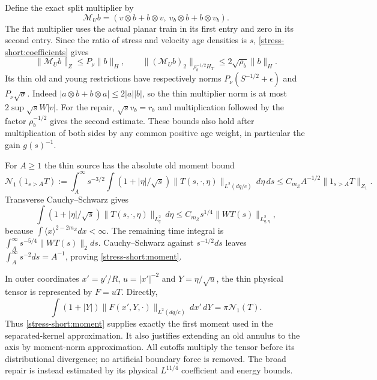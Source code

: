 Define the exact split multiplier by
\[
 \mathcal M_Ub=(v\otimes b+b\otimes v,\
                         v_b\otimes b+b\otimes v_b).
\]
The flat multiplier uses the actual planar train in its first entry
and zero in its second entry. Since the ratio of stress and velocity
age densities is $s$, \eqref{stress-short:coefficients} gives
\begin{equation}\label{stress-short:multiplier}
 \|\mathcal M_Ub\|_Z\le P_\nu\|b\|_H,\qquad
 \|(\mathcal M_Ub)_2\|_{\rho_b^{-1/2}H_T}
                         \le2\sqrt{\rho_b}\|b\|_H.
\end{equation}
Its thin old and young restrictions have respectively norms
$P_\nu(S^{-1/2}+\epsilon)$ and $P_\nu\sqrt{\sigma}$.
Indeed $|a\otimes b+b\otimes a|\le2|a||b|$, so the thin
multiplier norm is at most $2\sup\sqrt{s}W|v|$.
For the repair, $\sqrt{s}v_b=r_b$ and multiplication followed by
the factor $\rho_b^{-1/2}$ gives the second estimate.
These bounds also hold after multiplication of both sides by any
common positive age weight, in particular the gain $g(s)^{-1}$.

For $A\ge1$ the thin source has the absolute old moment bound
\begin{equation}\label{stress-short:moment}
 \mathcal N_1(1_{s>A}T):=
 \int_A^\infty s^{-3/2}\int
 (1+|\eta|/\sqrt{s})\|T(s,\cdot,\eta)\|_{L^2(dq/c)}\,d\eta\,ds
 \le C_{m_Z}A^{-1/2}\|1_{s>A}T\|_{Z_1}.
\end{equation}
Transverse Cauchy--Schwarz gives
\[
 \int(1+|\eta|/\sqrt{s})\|T(s,\cdot,\eta)\|_{L^2_q}\,d\eta
       \le C_{m_Z}s^{1/4}\|WT(s)\|_{L^2_{q,\eta}},
\]
because $\int\langle x\rangle^{2-2m_Z}dx<\infty$.
The remaining time integral is
$\int_A^\infty s^{-5/4}\|WT(s)\|_2ds$.
Cauchy--Schwarz against $s^{-1/2}ds$ leaves
$\int_A^\infty s^{-2}ds=A^{-1}$, proving
\eqref{stress-short:moment}.

In outer coordinates $x'=y'/R$, $u=|x'|^{-2}$ and
$Y=\eta/\sqrt u$, the thin physical tensor is represented by
$F=uT$. Directly,
\[
 \int(1+|Y|)\|F(x',Y,\cdot)\|_{L^2(dq/c)}\,dx'\,dY
       =\pi\mathcal N_1(T).
\]
Thus \eqref{stress-short:moment} supplies exactly the first moment
used in the separated-kernel approximation. It also justifies
extending an old annulus to the axis by moment-norm approximation.
All cutoffs multiply the tensor before its distributional divergence;
no artificial boundary force is removed. The broad repair is instead
estimated by its physical $L^{11/4}$ coefficient and energy bounds.
